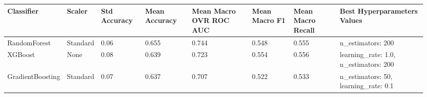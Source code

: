 \begin{tabular}{llllllll}
\toprule
Classifier & Scaler & Std Accuracy & Mean Accuracy & Mean Macro OVR ROC AUC & Mean Macro F1 & Mean Macro Recall & Best Hyperparameters Values \\
\midrule
RandomForest & Standard & 0.06 & 0.655 & 0.744 & 0.548 & 0.555 & {{n\_estimators: 200}} \\
XGBoost & None & 0.08 & 0.639 & 0.723 & 0.554 & 0.556 & {{learning\_rate: 1.0,  n\_estimators: 200}} \\
GradientBoosting & Standard & 0.07 & 0.637 & 0.707 & 0.522 & 0.533 & {{n\_estimators: 50,  learning\_rate: 0.1}} \\
\bottomrule
\end{tabular}
